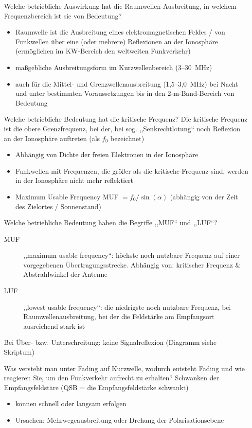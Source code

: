 \documentclass[avery5371,grid,frame,a4paper]{flashcards}
\newcommand{\card}[3]{
  \begin{flashcard}[{\chap} -- #1]{#2}#3\end{flashcard}
}
\begin{document}
\card{09}{Welche betriebliche Auswirkung hat die Raumwellen-Ausbreitung, in welchem Frequenzbereich ist sie von Bedeutung?}{
  \small
  \begin{itemize}
    \item Raumwelle ist die Ausbreitung eines elektromagnetischen Feldes / von Funkwellen über eine (oder mehrere) Reflexionen an der Ionosphäre (ermöglichen im KW-Bereich den weltweiten Funkverkehr)
    \item maßgebliche Ausbreitungsform im Kurzwellenbereich (3--30~MHz)
    \item auch für die Mittel- und Grenzwellenausbreitung (1,5--3,0~MHz) bei Nacht und unter bestimmten Voraussetzungen bis in den 2-m-Band-Bereich von Bedeutung
  \end{itemize}
}
\card{10}{Welche betriebliche Bedeutung hat die kritische Frequenz?}{
  \small
  Die kritische Frequenz ist die obere Grenzfrequenz, bei der, bei sog. ,,Senkrechtlotung`` noch Reflexion an der Ionosphäre auftreten (als $f_0$ bezeichnet)
  \begin{itemize}
    \item Abhängig von Dichte der freien Elektronen in der Ionosphäre
    \item Funkwellen mit Frequenzen, die größer als die kritische Frequenz sind, werden in der Ionosphäre nicht mehr reflektiert
    \item Maximum Usable Frequency MUF $= f_0 / \sin(\alpha)$ (abhängig von der Zeit des Zielortes / Sonnenstand)
  \end{itemize}
}
\card{11}{Welche betriebliche Bedeutung haben die Begriffe ,,MUF`` und ,,LUF``?}{
  \small
  \begin{description}
    \item[MUF] ,,maximum usable frequency``: höchste noch nutzbare Frequenz auf einer vorgegebenen Übertragungsstrecke. Abhängig von: kritischer Frequenz \& Abstrahlwinkel der Antenne
    \item[LUF] ,,lowest usable frequency``: die niedrigste noch nutzbare Frequenz, bei Raumwellenausbreitung, bei der die Feldstärke am Empfangsort ausreichend stark ist
  \end{description}
  Bei Über- bzw. Unterschreitung: keine Signalreflexion (Diagramm siehe Skriptum)
}
\card{12}{Was versteht man unter Fading auf Kurzwelle, wodurch entsteht Fading und wie reagieren Sie, um den Funkverkehr aufrecht zu erhalten?}{
  Schwanken der Empfangsfeldstäre (QSB = die Empfangsfeldstärke schwankt)
  \begin{itemize}
    \item können schnell oder langsam erfolgen
    \item Ursachen: Mehrwegeausbreitung oder Drehung der Polarisationsebene
  \end{itemize}
}
\end{document}
